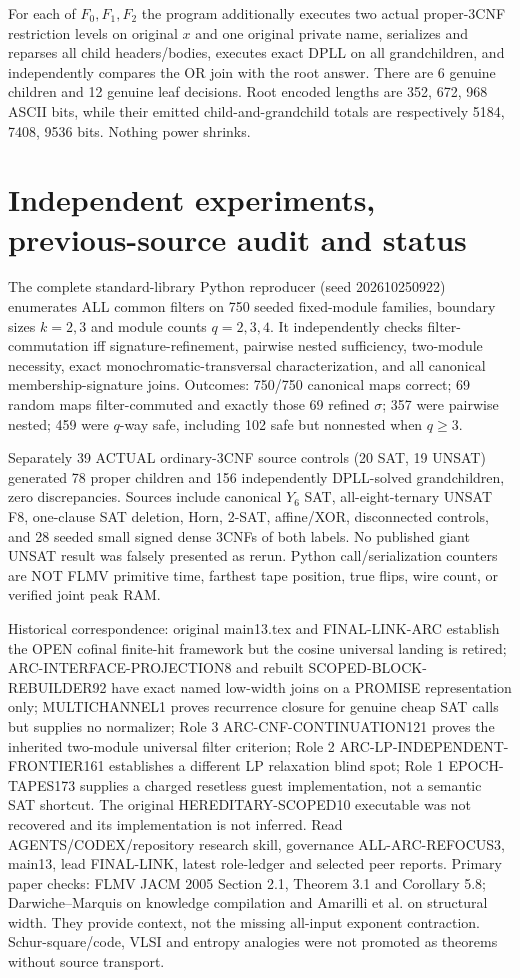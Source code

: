 \documentclass[11pt]{article}
\begin{document}
For each of $F_0,F_1,F_2$ the program additionally executes
two actual proper-3CNF restriction levels on original $x$
and one original private name, serializes and reparses all
child headers/bodies, executes exact DPLL on all grandchildren,
and independently compares the OR join with the root answer.
There are 6 genuine children and 12 genuine leaf decisions.
Root encoded lengths are 352, 672, 968 ASCII bits, while
their emitted child-and-grandchild totals are respectively
5184, 7408, 9536 bits. Nothing power shrinks.

\section{Independent experiments, previous-source audit and status}
The complete standard-library Python reproducer (seed
202610250922) enumerates ALL common filters on 750
seeded fixed-module families, boundary sizes $k=2,3$
and module counts $q=2,3,4$. It independently checks
filter-commutation iff signature-refinement, pairwise
nested sufficiency, two-module necessity, exact
monochromatic-transversal characterization, and all
canonical membership-signature joins. Outcomes:
750/750 canonical maps correct; 69 random maps
filter-commuted and exactly those 69 refined $\sigma$;
357 were pairwise nested; 459 were $q$-way safe,
including 102 safe but nonnested when $q\ge3$.

Separately 39 ACTUAL ordinary-3CNF source controls
(20 SAT, 19 UNSAT) generated 78 proper children and
156 independently DPLL-solved grandchildren, zero
discrepancies. Sources include canonical $Y_6$ SAT,
all-eight-ternary UNSAT F8, one-clause SAT deletion,
Horn, 2-SAT, affine/XOR, disconnected controls, and
28 seeded small signed dense 3CNFs of both labels.
No published giant UNSAT result was falsely presented
as rerun. Python call/serialization counters are NOT
FLMV primitive time, farthest tape position, true flips,
wire count, or verified joint peak RAM.

Historical correspondence: original main13.tex and
FINAL-LINK-ARC establish the OPEN cofinal finite-hit
framework but the cosine universal landing is retired;
ARC-INTERFACE-PROJECTION8 and rebuilt
SCOPED-BLOCK-REBUILDER92 have exact named low-width
joins on a PROMISE representation only;
MULTICHANNEL1 proves recurrence closure for
genuine cheap SAT calls but supplies no normalizer;
Role 3 ARC-CNF-CONTINUATION121 proves the inherited
two-module universal filter criterion;
Role 2 ARC-LP-INDEPENDENT-FRONTIER161 establishes
a different LP relaxation blind spot;
Role 1 EPOCH-TAPES173 supplies a charged resetless guest
implementation, not a semantic SAT shortcut.
The original HEREDITARY-SCOPED10 executable
was not recovered and its implementation is not inferred.
Read AGENTS/CODEX/repository research skill, governance
ALL-ARC-REFOCUS3, main13, lead FINAL-LINK,
latest role-ledger and selected peer reports.
Primary paper checks: FLMV JACM 2005 Section 2.1,
Theorem 3.1 and Corollary 5.8; Darwiche--Marquis
on knowledge compilation and Amarilli et al.
on structural width. They provide context, not the
missing all-input exponent contraction.
Schur-square/code, VLSI and entropy analogies
were not promoted as theorems without source transport.
\end{document}

